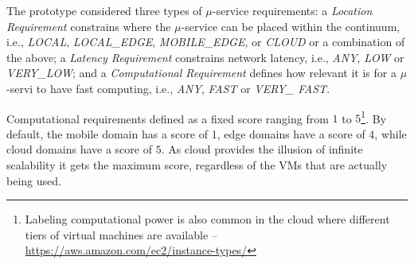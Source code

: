 The prototype considered three types of $\mu$-service requirements: a \textit{Location Requirement} constrains where the $\mu$-service can be placed within the continuum, i.e., \textit{LOCAL}, \textit{LOCAL\_EDGE}, \textit{MOBILE\_EDGE}, or \textit{CLOUD} or a combination of the above;  a \textit{Latency Requirement} constrains network latency, i.e., \textit{ANY}, \textit{LOW} or \textit{VERY\_LOW}; and a \textit{Computational Requirement} defines how relevant it is for a $\mu$-servi to have fast computing, i.e., \textit{ANY}, \textit{FAST} or \textit{VERY\_ FAST}. 

%	
%	
%	

Computational requirements defined as a fixed score ranging from $1$ to $5$\footnote{Labeling computational power is also common in the cloud where different tiers of virtual machines are available -- \url{https://aws.amazon.com/ec2/instance-types/}}. By default, the mobile domain has a score of $1$, edge domains have a score of $4$, while cloud domains have a score of $5$. As cloud provides the illusion of infinite scalability it gets the maximum score, regardless of the VMs that are actually being used. 

